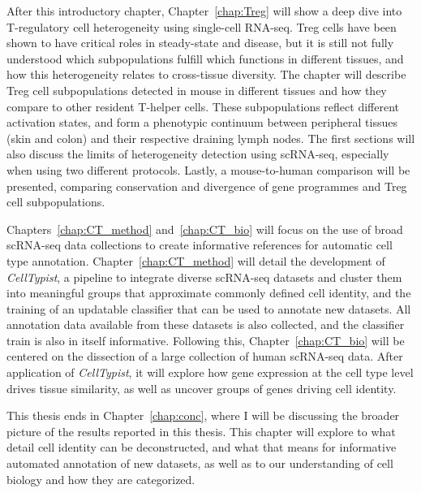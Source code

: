 After this introductory chapter, Chapter~\ref{chap:Treg} will show a deep dive into T-regulatory cell heterogeneity using single-cell RNA-seq. Treg cells have been shown to have critical roles in steady-state and disease, but it is still not fully understood which subpopulations fulfill which functions in different tissues, and how this heterogeneity relates to cross-tissue diversity. The chapter will describe Treg cell subpopulations detected in mouse in different tissues and how they compare to other resident T-helper cells. These subpopulations reflect different activation states, and form a phenotypic continuum between peripheral tissues (skin and colon) and their respective draining lymph nodes. The first sections will also discuss the limits of heterogeneity detection using scRNA-seq, especially when using two different protocols. Lastly, a mouse-to-human comparison will be presented, comparing conservation and divergence of gene programmes and Treg cell subpopulations.

Chapters~\ref{chap:CT_method} and~\ref{chap:CT_bio} will focus on the use of broad scRNA-seq data collections to create informative references for automatic cell type annotation. Chapter~\ref{chap:CT_method} will detail the development of \textit{CellTypist}, a pipeline to integrate diverse scRNA-seq datasets and cluster them into meaningful groups that approximate commonly defined cell identity, and the training of an updatable classifier that can be used to annotate new datasets. All annotation data available from these datasets is also collected, and the classifier train is also in itself informative. Following this, Chapter~\ref{chap:CT_bio} will be centered on the dissection of a large collection of human scRNA-seq data. After application of \textit{CellTypist}, it will explore how gene expression at the cell type level drives tissue similarity, as well as uncover groups of genes driving cell identity.

This thesis ends in Chapter~\ref{chap:conc}, where I will be discussing the broader picture of the results reported in this thesis. This chapter will explore to what detail cell identity can be deconstructed, and what that means for informative automated annotation of new datasets, as well as to our understanding of cell biology and how they are categorized. 